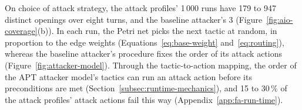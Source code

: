 \documentclass{cshonours}
\begin{document}
On choice of attack strategy, the attack profiles' 1\,000 runs have 179 to
947 distinct openings over eight turns, and the baseline attacker's 3
(Figure~\ref{fig:aio-coverage}(b)). In each run, the Petri net picks the next
tactic at random, in proportion to the edge weights
(Equations~\ref{eq:base-weight} and~\ref{eq:routing}), whereas the baseline
attacker's procedure fixes the order of its attack actions
(Figure~\ref{fig:attacker-model}).
Through the tactic-to-action mapping, the order of the APT attacker model's
tactics can run an attack action before its preconditions are met
(Section~\ref{subsec:runtime-mechanics}), and 15 to 30\,\% of the attack
profiles' attack actions fail this way (Appendix~\ref{app:fa-run-time}).
\end{document}
